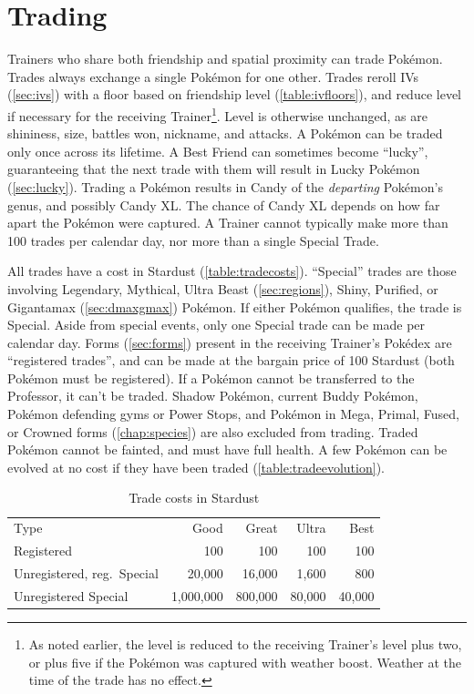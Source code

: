 \section{Trading\label{sec:trades}}
Trainers who share both friendship and spatial proximity can trade Pokémon.
Trades always exchange a single Pokémon for one other.
Trades reroll IVs (\autoref{sec:ivs}) with a floor based on friendship level (\autoref{table:ivfloors}),
  and reduce level if necessary for the receiving Trainer\footnote{As noted earlier, the level is reduced
  to the receiving Trainer's level plus two, or plus five if the Pokémon was captured with weather boost.
  Weather at the time of the trade has no effect.}.
Level is otherwise unchanged, as are shininess, size, battles won, nickname, and attacks.
A Pokémon can be traded only once across its lifetime.
A Best Friend can sometimes become ``lucky'', guaranteeing that the next trade with
  them will result in Lucky Pokémon (\autoref{sec:lucky}).
Trading a Pokémon results in Candy of the \textit{departing} Pokémon's genus,
  and possibly Candy XL.
The chance of Candy XL depends on how far apart the Pokémon were captured.
A Trainer cannot typically make more than 100 trades per calendar day, nor more
 than a single Special Trade.

All trades have a cost in Stardust (\autoref{table:tradecosts}).
``Special'' trades are those involving Legendary, Mythical, Ultra Beast (\autoref{sec:regions}),
  Shiny, Purified, or Gigantamax (\autoref{sec:dmaxgmax}) Pokémon.
If either Pokémon qualifies, the trade is Special.
Aside from special events, only one Special trade can be made per calendar day.
Forms (\autoref{sec:forms}) present in the receiving Trainer's Pokédex are
  ``registered trades'', and can be made at the bargain price of 100 Stardust
  (both Pokémon must be registered).
If a Pokémon cannot be transferred to the Professor, it can't be traded.
Shadow Pokémon, current Buddy Pokémon, Pokémon defending gyms or Power Stops, and Pokémon
 in Mega, Primal, Fused, or Crowned forms (\autoref{chap:species}) are also excluded from trading.
Traded Pokémon cannot be fainted, and must have full health.
A few Pokémon can be evolved at no cost if they have been traded (\autoref{table:tradeevolution}).
\begin{table}
\centering
\begin{tabular}{lrrrr}
Type & Good & Great & Ultra & Best\\
\Midrule
Registered & 100 & 100 & 100 & 100\\
Unregistered, reg.\ Special & 20,000 & 16,000 & 1,600 & 800\\
Unregistered Special & 1,000,000 & 800,000 & 80,000 & 40,000\\
\end{tabular}
  \caption{Trade costs in Stardust\label{table:tradecosts}}
\end{table}

